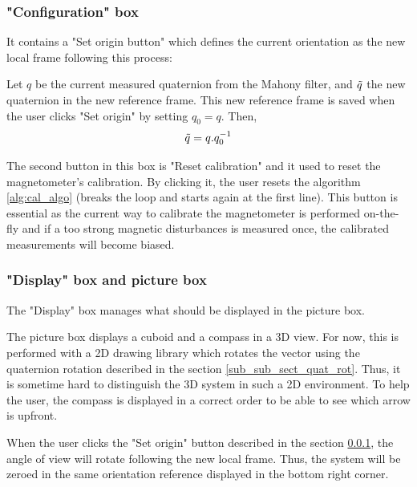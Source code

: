 \documentclass{article}
\begin{document}
\subsubsection{"Configuration" box} \label{sub_sub_sect_config_box}

It contains a "Set origin button" which defines the current orientation as the new local frame following this process:

\vspace{\baselineskip}

\noindent
Let $q$ be the current measured quaternion from the Mahony filter, and $\Tilde{q}$ the new quaternion in the new reference frame. This new reference frame is saved when the user clicks "Set origin" by setting $q_0 = q$. Then, 
$$  
\Tilde{q} = q.q_0^{-1}
$$

\vspace{\baselineskip}

The second button in this box is "Reset calibration" and it used to reset the magnetometer's calibration. By clicking it, the user resets the algorithm \ref{alg:cal_algo} (breaks the loop and starts again at the first line). This button is essential as the current way to calibrate the magnetometer is performed on-the-fly and if a too strong magnetic disturbances is measured once, the calibrated measurements will become biased. 

\subsubsection{"Display" box and picture box}

The "Display" box manages what should be displayed in the picture box. 

\vspace{\baselineskip}

The picture box displays a cuboid and a compass in a 3D view. For now, this is performed with a 2D drawing library which rotates the vector using the quaternion rotation described in the section \ref{sub_sub_sect_quat_rot}. Thus, it is sometime hard to distinguish the 3D system in such a 2D environment. To help the user, the compass is displayed in a correct order to be able to see which arrow is upfront.

\vspace{\baselineskip}

When the user clicks the "Set origin" button described in the section \ref{sub_sub_sect_config_box}, the angle of view will rotate following the new local frame. Thus, the system will be zeroed in the same orientation reference displayed in the bottom right corner.
\end{document}
